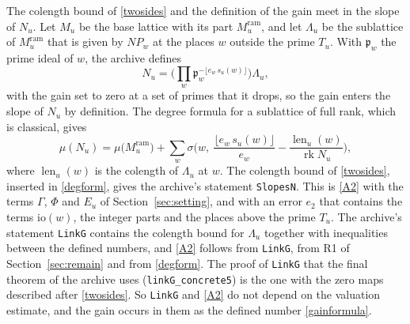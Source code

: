 \documentclass[11pt,letterpaper]{article}
\numberwithin{equation}{section}
\begin{document}
The colength bound of \eqref{twosides} and the definition of the gain meet in the slope of $N_u$. Let $M_u$ be the base lattice with its part $M_u^{\mathrm{ram}}$, and let $\Lambda_u$ be the sublattice of $M_u^{\mathrm{ram}}$ that is given by $N\!P_w$ at the places $w$ outside the prime $T_u$. With $\mathfrak p_w$ the prime ideal of $w$, the archive defines
\begin{equation}\label{Nscale}
N_u=\Big(\prod_w\mathfrak p_w^{-\lfloor e_w\,s_u(w)\rfloor}\Big)\Lambda_u ,
\end{equation}
with the gain set to zero at a set of primes that it drops, so the gain enters the slope of $N_u$ by definition. The degree formula for a sublattice of full rank, which is classical, gives
\begin{equation}\label{degform}
\mu(N_u)=\mu\big(M_u^{\mathrm{ram}}\big)+\sum_w\sigma\Big(w,\ \frac{\lfloor e_w\,s_u(w)\rfloor}{e_w}-\frac{\operatorname{len}_u(w)}{\operatorname{rk}N_u}\Big),
\end{equation}
where $\operatorname{len}_u(w)$ is the colength of $\Lambda_u$ at $w$. The colength bound of \eqref{twosides}, inserted in \eqref{degform}, gives the archive's statement \texttt{SlopesN}. This is \eqref{A2} with the terms $\Gamma$, $\Phi$ and $E_u$ of Section~\ref{sec:setting}, and with an error $e_2$ that contains the terms $\mathrm{io}(w)$, the integer parts and the places above the prime $T_u$. The archive's statement \texttt{LinkG} contains the colength bound for $\Lambda_u$ together with inequalities between the defined numbers, and \eqref{A2} follows from \texttt{LinkG}, from R1 of Section~\ref{sec:remain} and from \eqref{degform}. The proof of \texttt{LinkG} that the final theorem of the archive uses (\texttt{linkG\_concrete5}) is the one with the zero maps described after \eqref{twosides}. So \texttt{LinkG} and \eqref{A2} do not depend on the valuation estimate, and the gain occurs in them as the defined number \eqref{gainformula}.
\end{document}
